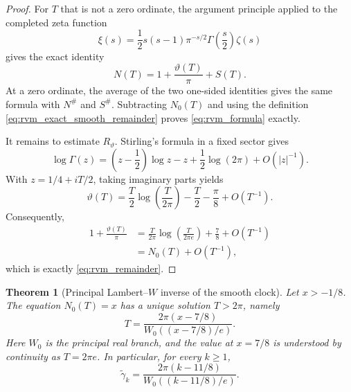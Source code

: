 \documentclass[11pt]{amsart}
\numberwithin{equation}{section}
\theoremstyle{plain}
\newtheorem{theorem}{Theorem}[section]
\theoremstyle{definition}
\theoremstyle{remark}
\newcommand{\1}{\mathbf{1}}
\begin{document}
\begin{proof}
For \(T\) that is not a zero ordinate, the argument principle applied to
the completed zeta function
\begin{equation}
\xi(s)
=
\frac12s(s-1)\pi^{-s/2}\Gamma\!\left(\frac s2\right)\zeta(s)
\label{eq:rvm_xi_definition}
\end{equation}
gives the exact identity
\begin{equation}
N(T)
=
1+\frac{\vartheta(T)}{\pi}+S(T).
\label{eq:rvm_theta_exact}
\end{equation}
At a zero ordinate, the average of the two one-sided identities gives the
same formula with \(N^{\#}\) and \(S^{\#}\).  Subtracting \(N_0(T)\) and
using the definition \eqref{eq:rvm_exact_smooth_remainder} proves
\eqref{eq:rvm_formula} exactly.

It remains to estimate \(R_\vartheta\).  Stirling's formula in a fixed
sector gives
\begin{equation}
\log\Gamma(z)
=
\left(z-\frac12\right)\log z-z+\frac12\log(2\pi)
+
O(|z|^{-1}).
\label{eq:rvm_stirling}
\end{equation}
With \(z=1/4+iT/2\), taking imaginary parts yields
\begin{equation}
\vartheta(T)
=
\frac T2\log\!\left(\frac{T}{2\pi}\right)
-
\frac T2
-
\frac\pi8
+
O(T^{-1}).
\label{eq:rvm_theta_asymptotic}
\end{equation}
Consequently,
\begin{align}
1+\frac{\vartheta(T)}{\pi}
&=
\frac{T}{2\pi}\log\!\left(\frac{T}{2\pi e}\right)
+\frac78+O(T^{-1})
\label{eq:rvm_substitution_one}
\\
&=
N_0(T)+O(T^{-1}),
\label{eq:rvm_substitution_two}
\end{align}
which is exactly \eqref{eq:rvm_remainder}.
\end{proof}

\begin{theorem}[Principal Lambert--\(W\) inverse of the smooth clock]
\label{thm:rvm_lambert_inverse}
Let \(x>-1/8\).  The equation \(N_0(T)=x\) has a unique solution
\(T>2\pi\), namely
\begin{equation}
\boxed{
T
=
\frac{2\pi(x-7/8)}
{W_0\!\left((x-7/8)/e\right)}.
}
\label{eq:rvm_lambert_inverse}
\end{equation}
Here \(W_0\) is the principal real branch, and the value at \(x=7/8\) is
understood by continuity as \(T=2\pi e\).  In particular, for every
\(k\geq1\),
\begin{equation}
\widetilde\gamma_k
=
\frac{2\pi(k-11/8)}
{W_0\!\left((k-11/8)/e\right)}.
\label{eq:rvm_gamma_tilde}
\end{equation}
\end{theorem}
\end{document}
